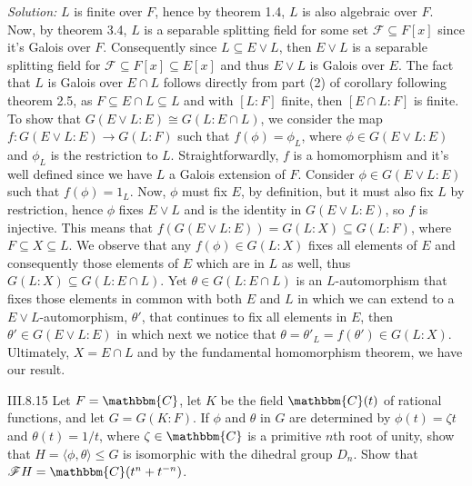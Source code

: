 \documentclass{letter}
\newcommand{\tmem}[1]{{\em #1\/}}
\begin{document}
{\tmem{Solution:}} $L$ is finite over $F$, hence by theorem 1.4, $L$ is also
algebraic over $F$. Now, by theorem 3.4, $L$ is a separable splitting field
for some set $\mathcal{F} \subseteq F [x]$ since it's Galois over $F$.
Consequently since $L \subseteq E \vee L$, then $E \vee L$ is a separable
splitting field for $\mathcal{F} \subseteq F [x] \subseteq E [x]$ and thus $E
\vee L$ is Galois over $E$. The fact that $L$ is Galois over $E \cap L$
follows directly from part (2) of corollary following theorem 2.5, as $F
\subseteq E \cap L \subseteq L$ and with $[L : F]$ finite, then $[E \cap L :
F]$ is finite. To show that $G (E \vee L : E) \cong G (L : E \cap L)$, we
consider the map $f : G (E \vee L : E) \rightarrow G (L : F)$ such that $f
(\phi) = \phi_L$, where $\phi \in G (E \vee L : E)$ and $\phi_L$ is the
restriction to $L$. Straightforwardly, $f$ is a homomorphism and it's well
defined since we have $L$ a Galois extension of $F$. Consider $\phi \in G (E
\vee L : E)$ such that $f (\phi) = 1_L$. Now, $\phi$ must fix $E$, by
definition, but it must also fix $L$ by restriction, hence $\phi$ fixes $E
\vee L$ and is the identity in $G (E \vee L : E)$, so $f$ is injective. This
means that $f (G (E \vee L : E)) = G (L : X) \subseteq G (L : F)$, where $F
\subseteq X \subseteq L$. We observe that any $f (\phi) \in G (L : X)$ fixes
all elements of $E$ and consequently those elements of $E$ which are in $L$ as
well, thus $G (L : X) \subseteq G (L : E \cap L)$. Yet $\theta \in G (L : E
\cap L)$ is an $L$-automorphism that fixes those elements in common with both
$E$ and $L$ in which we can extend to a $E \vee L$-automorphism, $\theta'$,
that continues to fix all elements in $E$, then $\theta' \in G (E \vee L : E)$
in which next we notice that $\theta = \theta'_L = f (\theta') \in G (L : X)$.
Ultimately, $X = E \cap L$ and by the fundamental homomorphism theorem, we
have our result.

III.8.15 Let $F =\mathbbm{C}$, let $K$ be the field $\mathbbm{C}(t)$ of
rational functions, and let $G = G (K : F)$. If $\phi$ and $\theta$ in $G$ are
determined by $\phi (t) = \zeta t$ and $\theta (t) = 1 / t$, where $\zeta \in
\mathbbm{C}$ is a primitive $n$th root of unity, show that $H = \langle \phi,
\theta \rangle \leq G$ is isomorphic with the dihedral group $D_n$. Show that
$\mathcal{F}H =\mathbbm{C}(t^n + t^{- n})$.
\end{document}
